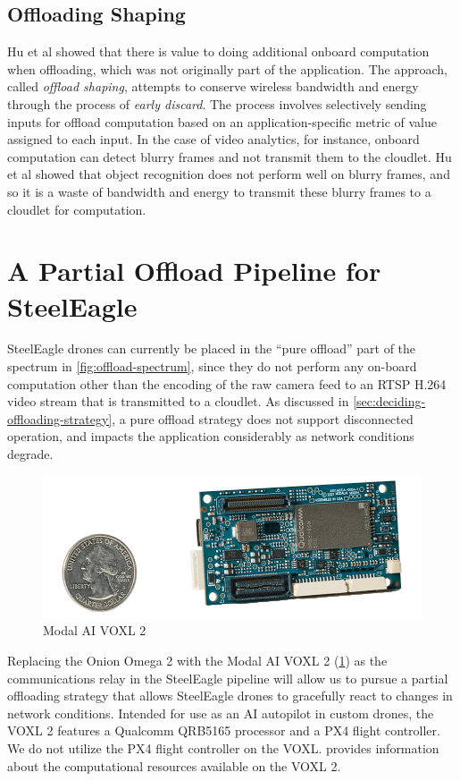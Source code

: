 \subsection{Offloading Shaping}
\label{sec:offload-shaping}

Hu et al \cite{hu2015} showed that there is value to doing additional onboard
computation when offloading, which was not originally part of the application.
The approach, called \textit{offload shaping}, attempts to conserve wireless
bandwidth and energy through the process of \textit{early discard}. The process
involves selectively sending inputs for offload computation based on an
application-specific metric of value assigned to each input.  In the case of
video analytics, for instance, onboard computation can detect blurry frames and
not transmit them to the cloudlet. Hu et al showed that object recognition does
not perform well on blurry frames, and so it is a waste of bandwidth and energy
to transmit these blurry frames to a cloudlet for computation.

\section{A Partial Offload Pipeline for SteelEagle}

SteelEagle drones can currently be placed in the ``pure offload'' part of the
spectrum in \cref{fig:offload-spectrum}, since they do not perform any on-board
computation other than the encoding of the raw camera feed to an RTSP H.264
video stream that is transmitted to a cloudlet. As discussed in
\cref{sec:deciding-offloading-strategy}, a pure offload strategy does not
support disconnected operation, and impacts the application considerably as
network conditions degrade.

\begin{figure}[htbp]
\centerline{\includegraphics[width = .5\textwidth]{figs/voxl2.png}}
\caption{Modal AI VOXL 2}
\label{fig:voxl2}
\end{figure}

Replacing the Onion Omega 2 with the Modal AI VOXL 2 (\cref{fig:voxl2}) as the
communications relay in the SteelEagle pipeline will allow us to pursue a
partial offloading strategy that allows SteelEagle drones to gracefully react
to changes in network conditions. Intended for use as an AI autopilot in custom
drones, the VOXL 2 features a Qualcomm QRB5165 processor and a PX4 flight
controller. We do not utilize the PX4 flight controller on the VOXL.
 provides information about the computational resources
available on the VOXL 2.

